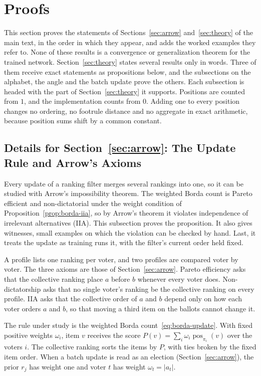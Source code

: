 \section{Proofs}\label{supp:proofs}

This section proves the statements of Sections~\ref{sec:arrow} and~\ref{sec:theory} of the main text, in the order in which they appear, and adds the worked examples they refer to. None of these results is a convergence or generalization theorem for the trained network. Section~\ref{sec:theory} states several results only in words. Three of them receive exact statements as propositions below, and the subsections on the alphabet, the angle and the batch update prove the others. Each subsection is headed with the part of Section~\ref{sec:theory} it supports. Positions are counted from $1$, and the implementation counts from $0$. Adding one to every position changes no ordering, no footrule distance and no aggregate in exact arithmetic, because position sums shift by a common constant.

\subsection{Details for Section~\ref*{sec:arrow}: The Update Rule and Arrow's Axioms}\label{supp:iia}

Every update of a ranking filter merges several rankings into one, so it can be studied with Arrow's impossibility theorem. The weighted Borda count is Pareto efficient and non-dictatorial under the weight condition of Proposition~\ref{prop:borda-iia}, so by Arrow's theorem it violates independence of irrelevant alternatives (IIA). This subsection proves the proposition. It also gives witnesses, small examples on which the violation can be checked by hand. Last, it treats the update as training runs it, with the filter's current order held fixed.

A profile lists one ranking per voter, and two profiles are compared voter by voter. The three axioms are those of Section~\ref{sec:arrow}. Pareto efficiency asks that the collective ranking place $a$ before $b$ whenever every voter does. Non-dictatorship asks that no single voter's ranking be the collective ranking on every profile. IIA asks that the collective order of $a$ and $b$ depend only on how each voter orders $a$ and $b$, so that moving a third item on the ballots cannot change it.

The rule under study is the weighted Borda count~\eqref{eq:borda-update}. With fixed positive weights $\omega_i$, item $v$ receives the score $P(v)=\sum_i\omega_i\operatorname{pos}_{\pi_i}(v)$ over the voters $i$. The collective ranking sorts the items by $P$, with ties broken by the fixed item order. When a batch update is read as an election (Section~\ref{sec:arrow}), the prior $r_j$ has weight one and voter $t$ has weight $\omega_t=|a_t|$.

